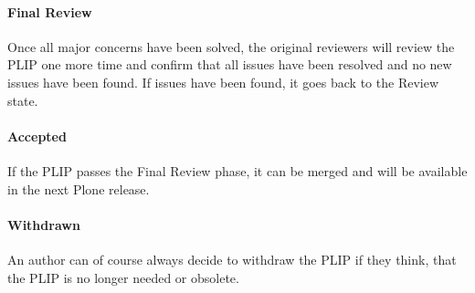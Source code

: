 \paragraph{Final Review}

Once all major concerns have been solved, the original reviewers will review
the \ac{PLIP} one more time and confirm that all issues have been resolved and
no new issues have been found. If issues have been found, it goes back to the
Review state.

\paragraph{Accepted}

If the \ac{PLIP} passes the Final Review phase, it can be merged and will be
available in the next Plone release.

\paragraph{Withdrawn}

An author can of course always decide to withdraw the \ac{PLIP} if they think,
that the \ac{PLIP} is no longer needed or obsolete.


